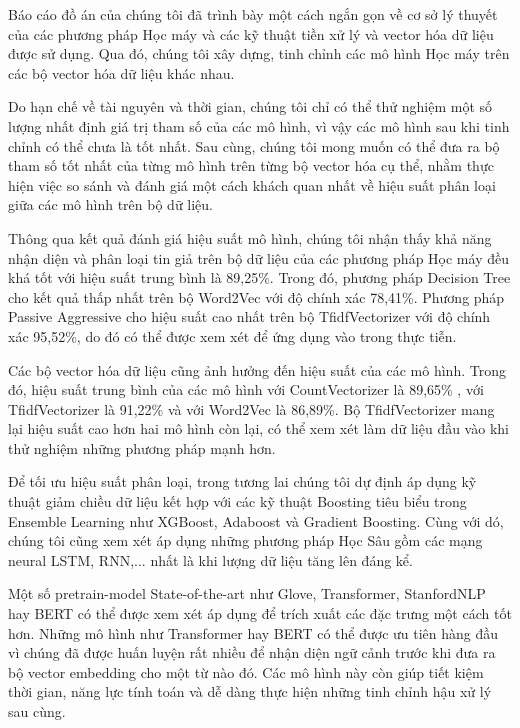 \documentclass[12pt,a4paper,oneside]{book}
\begin{document}
Báo cáo đồ án của chúng tôi đã trình bày một cách ngắn gọn về cơ sở lý thuyết của các phương pháp Học máy và các kỹ thuật tiền xử lý và vector hóa dữ liệu được sử dụng. Qua đó, chúng tôi xây dựng, tinh chỉnh các mô hình Học máy trên các bộ vector hóa dữ liệu khác nhau.

Do hạn chế về tài nguyên và thời gian, chúng tôi chỉ có thể thử nghiệm một số lượng nhất định giá trị tham số của các mô hình, vì vậy các mô hình sau khi tinh chỉnh có thể chưa là tốt nhất. Sau cùng, chúng tôi mong muốn có thể đưa ra bộ tham số tốt nhất của từng mô hình trên từng bộ vector hóa cụ thể, nhằm thực hiện việc so sánh và đánh giá một cách khách quan nhất về hiệu suất phân loại giữa các mô hình trên bộ dữ liệu.

Thông qua kết quả đánh giá hiệu suất mô hình, chúng tôi nhận thấy khả năng nhận diện và phân loại tin giả trên bộ dữ liệu của các phương pháp Học máy đều khá tốt với hiệu suất trung bình là 89,25\%. Trong đó, phương pháp Decision Tree cho kết quả thấp nhất trên bộ Word2Vec với độ chính xác 78,41\%. Phương pháp Passive Aggressive cho hiệu suất cao nhất trên bộ TfidfVectorizer với độ chính xác 95,52\%, do đó có thể được xem xét để ứng dụng vào trong thực tiễn.

Các bộ vector hóa dữ liệu cũng ảnh hưởng đến hiệu suất của các mô hình. Trong đó, hiệu suất trung bình của các mô hình với CountVectorizer là 89,65\% , với TfidfVectorizer là 91,22\% và với Word2Vec là 86,89\%. Bộ TfidfVectorizer mang lại hiệu suất cao hơn hai mô hình còn lại, có thể xem xét làm dữ liệu đầu vào khi thử nghiệm những phương pháp mạnh hơn.

Để tối ưu hiệu suất phân loại, trong tương lai chúng tôi dự định áp dụng kỹ thuật giảm chiều dữ liệu kết hợp với các kỹ thuật Boosting tiêu biểu trong Ensemble Learning như XGBoost, Adaboost và Gradient Boosting. Cùng với dó, chúng tôi cũng xem xét áp dụng những phương pháp Học Sâu gồm các mạng neural LSTM, RNN,... nhất là khi lượng dữ liệu tăng lên đáng kể.

Một số pretrain-model State-of-the-art như Glove, Transformer, StanfordNLP hay BERT có thể được xem xét áp dụng để trích xuất các đặc trưng một cách tốt hơn. Những mô hình như Transformer hay BERT có thể được ưu tiên hàng đầu vì chúng đã được huấn luyện rất nhiều để nhận diện ngữ cảnh trước khi đưa ra bộ vector embedding cho một từ nào đó. Các mô hình này còn giúp tiết kiệm thời gian, năng lực tính toán và dễ dàng thực hiện những tinh chỉnh hậu xử lý sau cùng.
\end{document}
